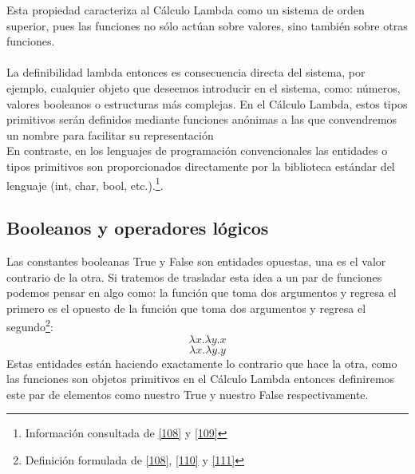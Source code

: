  Esta propiedad caracteriza al Cálculo Lambda como un sistema de orden superior, 
 pues las funciones no sólo actúan sobre valores, sino también sobre otras funciones.\\\\
 La definibilidad lambda entonces es consecuencia directa del sistema, por ejemplo, 
 cualquier objeto que deseemos introducir en el sistema, como: números, valores booleanos 
 o estructuras más complejas. En el Cálculo Lambda,
 estos tipos primitivos serán definidos mediante funciones anónimas a las que 
 convendremos un nombre para facilitar su representación\\
 
 En contraste, en los lenguajes de programación convencionales las entidades o tipos 
 primitivos son proporcionados directamente por la biblioteca estándar del lenguaje 
 (\textsf{int}, \textsf{char}, \textsf{bool}, etc.).\footnote{Información consultada de \hyperlink{108}{[108]} y  \hyperlink{109}{[109]}}.
 
 
  \subsection{Booleanos y operadores lógicos}
 Las constantes booleanas \textsf{True} y \textsf{False} son entidades opuestas, una es el valor contrario de la otra. Si tratemos de trasladar esta idea a un par de funciones podemos pensar en algo como:
 la función que toma dos argumentos y regresa el primero es el opuesto de la función que toma dos argumentos y regresa el segundo\footnote{Definición formulada de \hyperlink{108}{[108]},  \hyperlink{110}{[110]} y  \hyperlink{111}{[111]}}:
 \[
 \lambda x.\lambda y.x
 \]
 \[
 \lambda x.\lambda y.y
 \]
 Estas entidades están haciendo exactamente lo contrario que hace la otra, como las funciones son objetos primitivos en el Cálculo Lambda entonces definiremos este par de elementos como nuestro \textsf{True} y nuestro \textsf{False} respectivamente.
 
